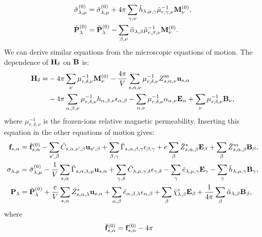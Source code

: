 \documentclass[12pt,a4paper]{article}
\begin{document}
{\begin{align}
\check \sigma^{(0)}_{\lambda,\mu} &= \tilde \sigma^{(0)}_{\lambda,\mu}
+ 4 \pi \sum_{\gamma,\nu} \tilde h_{\lambda,\mu,\gamma} 
\tilde \mu^{-1}_{r,\gamma,\nu} {\bf M}^{(0)}_\nu,  \\
\check {\bf P}^{(0)}_{\lambda} &= \tilde {\bf P}^{(0)}_{\lambda}
- \sum_{\beta,\nu} \tilde \alpha_{\lambda,\beta} 
\tilde \mu^{-1}_{r,\beta,\nu} {\bf M}^{(0)}_\nu. 
\end{align}
We can derive similar equations from the microscopic equations of motion.
The dependence of ${\bf H}_\delta$ on ${\bf B}$ is:
\begin{align}
{\bf H}_\delta = 
&- 4 \pi \sum_\nu \mu^{-1}_{r,\delta,\nu} {\bf M}^{(0)}_\nu 
-{4 \pi \over V} \sum_{s,\alpha,\nu} \mu^{-1}_{r,\delta,\nu} Z^m_{s,\alpha,\nu}
{\bf u}_{s,\alpha} \nonumber\\
&- 4 \pi \sum_{\alpha,\beta,\nu} \mu^{-1}_{r,\delta,\nu} h_{\alpha,\beta,\nu}
\epsilon_{\alpha,\beta} - \sum_{\alpha,\nu}
\mu^{-1}_{r,\delta,\nu} \alpha_{\alpha,\nu} {\bf E}_\alpha
+ \sum_\nu \mu^{-1}_{r,\delta,\nu} {\bf B}_\nu, 
\end{align}
where $\mu^{-1}_{r,\delta,\nu}$ is the frozen-ions relative magnetic
permeability.
Inserting this equation in the other equations of motion gives:
\begin{align}
{\bf f}_{s,\alpha}&= \breve{\bf f}^{(0)}_{s,\alpha}
-\sum_{s',\beta} \breve C_{s,\alpha,s',\beta} {\bf u}_{s',\beta}
+\sum_{\beta,\gamma}
\breve \Gamma_{s,\alpha,\beta,\gamma} 
\epsilon_{\beta,\gamma} +
e \sum_{\beta} \breve Z^*_{s,\alpha,\beta} {\bf E}_{\beta}
+\sum_{\beta} 
\breve Z^m_{s,\alpha,\beta} {\bf B}_{\beta}, \\
\sigma_{\lambda,\mu}&= \breve  \sigma_{\lambda,\mu}^{(0)}
-{1\over V} \sum_{s,\alpha}
\breve \Gamma_{s,\alpha,\lambda,\mu} {\bf u}_{s,\alpha}
+\sum_{\gamma,\delta} \breve C_{\lambda,\mu,\gamma,\delta}  
\epsilon_{\gamma,\delta} -
\sum_{\gamma} \breve e_{\lambda,\mu,\gamma} 
 {\bf E}_{\gamma}
-\sum_{\gamma}  \breve h_{\lambda,\mu,\gamma} 
{\bf B}_{\gamma}, \\
{\bf P}_{\lambda}&= \breve {\bf P}^{(0)}_{\lambda}
+{e\over V} \sum_{s,\alpha} \breve Z^*_{s,\alpha,\lambda} 
{\bf u}_{s,\alpha} +
\sum_{\alpha,\beta} \breve e_{\alpha,\beta,\lambda} 
\epsilon_{\alpha,\beta} +
\sum_{\beta} 
\breve \chi^e_{\lambda,\beta}
{\bf E}_{\beta} +
{1\over 4 \pi} \sum_{\beta} \breve \alpha_{\lambda,\beta} 
{\bf B}_{\beta}, 
\end{align}
where
\begin{align}
\breve {\bf f}^{(0)}_{s,\alpha}&= {\bf f}^{(0)}_{s,\alpha} - 4 \pi

\end{align}}
\end{document}
